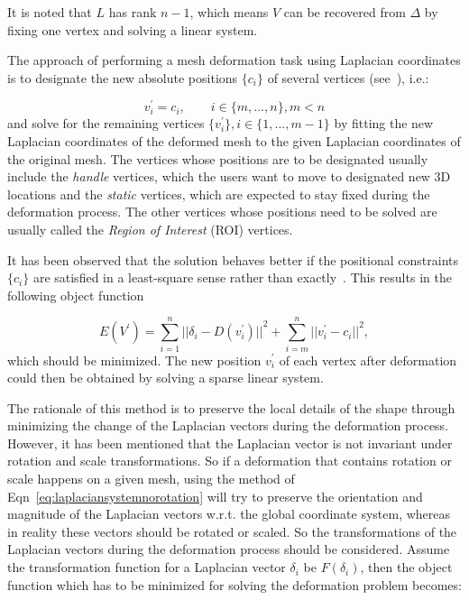 It is noted that $L$ has rank $n-1$, which means $V$ can be recovered from $\Delta$ by fixing one vertex and solving a linear system.

The approach of performing a mesh deformation task using Laplacian coordinates is to designate the new absolute positions $\{c_i\}$ of several vertices (see~\cite{LSCLRS04}), i.e.:

\begin{equation}
\label{eq:lapconstr}
v_i^\prime=c_i ,\quad \quad i\in\{m,...,n\},m<n
\end{equation}
and solve for the remaining vertices $\{v_i^\prime\},i\in \{1,...,m-1\}$ by fitting the new Laplacian coordinates of the deformed mesh to the given Laplacian coordinates of the original mesh. The vertices whose positions are to be designated usually include the \textit{handle} vertices, which the users want to move to designated new 3D locations and the \textit{static} vertices, which are expected to stay fixed during the deformation process. The other vertices whose positions need to be solved are usually called the \textit{Region of Interest} (ROI) vertices.

It has been observed that the solution behaves better if the positional constraints $\{c_i\}$ are satisfied in a least-square sense rather than exactly~\cite{LSCLRS04,SCLARS04}. This results in the following object function

\begin{equation}
\label{eq:laplaciansystemnorotation}
E(V^\prime)=\sum\limits_{i=1}^n {||\delta_i-D(v_i^\prime)||}^2 +
\sum\limits_{i=m}^n {||v_i^\prime-c_i||}^2 ,
\end{equation}
which should be minimized. The new position $v_i^\prime$ of each vertex after deformation could then be obtained by solving a sparse linear system.

The rationale of this method is to preserve the local details of the shape through minimizing the change of the Laplacian vectors during the deformation process. However, it has been mentioned that the Laplacian vector is not invariant under rotation and scale transformations. So if a deformation that contains rotation or scale happens on a given mesh, using the method of Eqn~\ref{eq:laplaciansystemnorotation} will try to preserve the orientation and magnitude of the Laplacian vectors w.r.t. the global coordinate system, whereas in reality these vectors should be rotated or scaled. So the transformations of the Laplacian vectors during the deformation process should be considered. Assume the transformation function for a Laplacian vector $\delta_i$ be $F(\delta_i)$, then the object function which has to be minimized for solving the deformation problem becomes:

